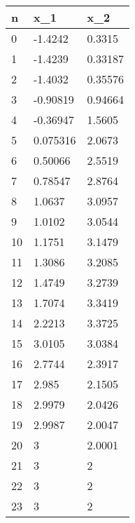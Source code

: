 \begin{tabular}{lll}
n & x_{1} & x_{2} \\ 
\hline 
0 & -1.4242 & 0.3315 \\ 
1 & -1.4239 & 0.33187 \\ 
2 & -1.4032 & 0.35576 \\ 
3 & -0.90819 & 0.94664 \\ 
4 & -0.36947 & 1.5605 \\ 
5 & 0.075316 & 2.0673 \\ 
6 & 0.50066 & 2.5519 \\ 
7 & 0.78547 & 2.8764 \\ 
8 & 1.0637 & 3.0957 \\ 
9 & 1.0102 & 3.0544 \\ 
10 & 1.1751 & 3.1479 \\ 
11 & 1.3086 & 3.2085 \\ 
12 & 1.4749 & 3.2739 \\ 
13 & 1.7074 & 3.3419 \\ 
14 & 2.2213 & 3.3725 \\ 
15 & 3.0105 & 3.0384 \\ 
16 & 2.7744 & 2.3917 \\ 
17 & 2.985 & 2.1505 \\ 
18 & 2.9979 & 2.0426 \\ 
19 & 2.9987 & 2.0047 \\ 
20 & 3 & 2.0001 \\ 
21 & 3 & 2 \\ 
22 & 3 & 2 \\ 
23 & 3 & 2 \\ 
\hline 
\end{tabular}